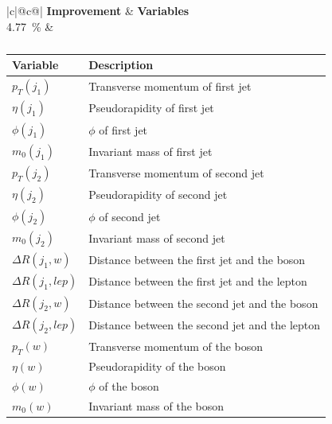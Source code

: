 \begin{table}[h]
    \centering
    \label{tab:app_vars_1}
    \caption{}
    \begin{tabular}{ |c|@{}c@{}| }
        \hline
        \textbf{Improvement} & \textbf{Variables}\\
        \hline
        \SI{4.77}{\%} & 
        \begin{tabular}{ll}
            \hline
            Variable & Description\\
            \hline
            $p_T(j_1)$ & Transverse momentum of first jet\\
            $\eta(j_1)$ & Pseudorapidity of first jet\\
            $\phi(j_1)$ & $\phi$ of first jet\\
            $m_0(j_1)$ & Invariant mass of first jet\\

            $p_T(j_2)$ & Transverse momentum of second jet\\
            $\eta(j_2)$ & Pseudorapidity of second jet\\
            $\phi(j_2)$ & $\phi$ of second jet\\
            $m_0(j_2)$ & Invariant mass of second jet\\

            $\Delta R(j_1, w)$ & Distance between the first jet and the \PWplus boson\\
            $\Delta R(j_1, lep)$ & Distance between the first jet and the lepton\\
            $\Delta R(j_2, w)$ & Distance between the second jet and the \PWplus boson\\
            $\Delta R(j_2, lep)$ & Distance between the second jet and the lepton\\

            $p_T(w)$ & Transverse momentum of the \PWplus boson\\
            $\eta(w)$ & Pseudorapidity of the \PWplus boson\\
            $\phi(w)$ & $\phi$ of the \PWplus boson\\
            $m_0(w)$ & Invariant mass of the \PWplus boson\\
            \hline
        \end{tabular}\\
        \hline
    \end{tabular}
\end{table}

